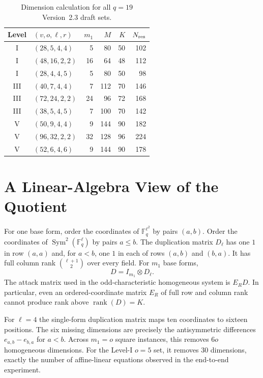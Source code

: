 \documentclass[runningheads]{llncs}
\newcommand{\F}{\mathbb F}
\newcommand{\Sym}{\operatorname{Sym}}
\newcommand{\rank}{\operatorname{rank}}
\begin{document}
\begin{table}[ht]
\centering
\caption{Dimension calculation for all $q=19$ Version~2.3 draft sets.}\label{tab:params}
\small
\begin{tabular}{@{}c l r r r r@{}}
\toprule
Level & $(v,o,\ell,r)$ & $m_1$ & $M$ & $K$ & $N_{\rm res}$\\
\midrule
I   & $(28,5,4,4)$  & 5  & 80  & 50 & 102\\
I   & $(48,16,2,2)$ & 16 & 64  & 48 & 112\\
I   & $(28,4,4,5)$  & 5  & 80  & 50 & 98\\
III & $(40,7,4,4)$  & 7  & 112 & 70 & 146\\
III & $(72,24,2,2)$ & 24 & 96  & 72 & 168\\
III & $(38,5,4,5)$  & 7  & 100 & 70 & 142\\
V   & $(50,9,4,4)$  & 9  & 144 & 90 & 182\\
V   & $(96,32,2,2)$ & 32 & 128 & 96 & 224\\
V   & $(52,6,4,6)$  & 9  & 144 & 90 & 178\\
\bottomrule
\end{tabular}
\end{table}

\section{A Linear-Algebra View of the Quotient}\label{app:linear}

For one base form, order the coordinates of $\F_q^{\ell^2}$ by pairs $(a,b)$.  Order the coordinates of $\Sym^2(\F_q^\ell)$ by pairs $a\le b$.  The duplication matrix $D_\ell$ has one $1$ in row $(a,a)$ and, for $a<b$, one $1$ in each of rows $(a,b)$ and $(b,a)$.  It has full column rank $\binom{\ell+1}{2}$ over every field.  For $m_1$ base forms,
\[
 D=I_{m_1}\otimes D_\ell.
\]
The attack matrix used in the odd-characteristic homogeneous system is $E_RD$.  In particular, even an ordered-coordinate matrix $E_R$ of full row and column rank cannot produce rank above $\rank(D)=K$.

For $\ell=4$ the single-form duplication matrix maps ten coordinates to sixteen positions.  The six missing dimensions are precisely the antisymmetric differences $e_{a,b}-e_{b,a}$ for $a<b$.  Across $m_1=o$ square instances, this removes $6o$ homogeneous dimensions.  For the Level-I $o=5$ set, it removes 30 dimensions, exactly the number of affine-linear equations observed in the end-to-end experiment.
\end{document}
